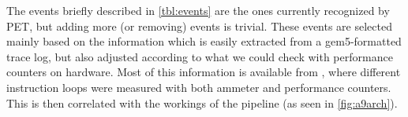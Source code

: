 The events briefly described in \autoref{tbl:events} are the ones currently
recognized by PET, but adding more (or removing) events is trivial. These events
are selected mainly based on the information which is easily extracted from a
gem5-formatted trace log, but also adjusted according to what we could check
with performance counters on hardware. Most of this information is available
from \cite{rundehvatum2013exploring}, where different instruction loops were
measured with both ammeter and performance counters. This is then correlated
with the workings of the pipeline (as seen in \autoref{fig:a9arch}).

